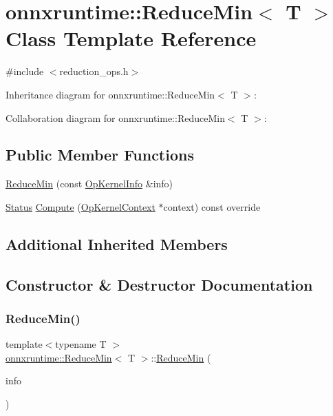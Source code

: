 \hypertarget{classonnxruntime_1_1ReduceMin}{}\section{onnxruntime\+:\+:Reduce\+Min$<$ T $>$ Class Template Reference}
\label{classonnxruntime_1_1ReduceMin}


{\ttfamily \#include $<$reduction\+\_\+ops.\+h$>$}



Inheritance diagram for onnxruntime\+:\+:Reduce\+Min$<$ T $>$\+:


Collaboration diagram for onnxruntime\+:\+:Reduce\+Min$<$ T $>$\+:
\subsection*{Public Member Functions}
\begin{DoxyCompactItemize}
\item 
\mbox{\hyperlink{classonnxruntime_1_1ReduceMin_afd8ba545e8e524f2a1a1ddb884c64dcd}{Reduce\+Min}} (const \mbox{\hyperlink{classonnxruntime_1_1OpKernelInfo}{Op\+Kernel\+Info}} \&info)
\item 
\mbox{\hyperlink{classonnxruntime_1_1common_1_1Status}{Status}} \mbox{\hyperlink{classonnxruntime_1_1ReduceMin_a938dcceb5bcd6f1783bd42dcdb33adab}{Compute}} (\mbox{\hyperlink{classonnxruntime_1_1OpKernelContext}{Op\+Kernel\+Context}} $\ast$context) const override
\end{DoxyCompactItemize}
\subsection*{Additional Inherited Members}


\subsection{Constructor \& Destructor Documentation}
\mbox{\label{classonnxruntime_1_1ReduceMin_afd8ba545e8e524f2a1a1ddb884c64dcd}} 
\subsubsection{\texorpdfstring{Reduce\+Min()}{ReduceMin()}}
{\footnotesize\ttfamily template$<$typename T $>$ \\
\mbox{\hyperlink{classonnxruntime_1_1ReduceMin}{onnxruntime\+::\+Reduce\+Min}}$<$ T $>$\+::\mbox{\hyperlink{classonnxruntime_1_1ReduceMin}{Reduce\+Min}} (\begin{DoxyParamCaption}\item[{const \mbox{\hyperlink{classonnxruntime_1_1OpKernelInfo}{Op\+Kernel\+Info}} \&}]{info }\end{DoxyParamCaption})\hspace{0.3cm}{\ttfamily [inline]}}



